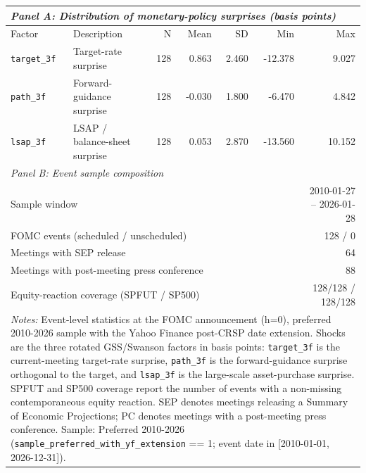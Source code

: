 \begin{tabular}{l l r r r r r}
\toprule
\multicolumn{7}{l}{\textit{Panel A: Distribution of monetary-policy surprises (basis points)}} \\
\midrule
Factor & Description & N & Mean & SD & Min & Max \\
\midrule
\texttt{target\_3f} & Target-rate surprise & 128 & 0.863 & 2.460 & -12.378 & 9.027 \\
\texttt{path\_3f} & Forward-guidance surprise & 128 & -0.030 & 1.800 & -6.470 & 4.842 \\
\texttt{lsap\_3f} & LSAP / balance-sheet surprise & 128 & 0.053 & 2.870 & -13.560 & 10.152 \\
\midrule
\multicolumn{7}{l}{\textit{Panel B: Event sample composition}} \\
\midrule
\multicolumn{6}{l}{Sample window} & 2010-01-27 -- 2026-01-28 \\
\multicolumn{6}{l}{FOMC events (scheduled / unscheduled)} & 128 / 0 \\
\multicolumn{6}{l}{Meetings with SEP release} & 64 \\
\multicolumn{6}{l}{Meetings with post-meeting press conference} & 88 \\
\multicolumn{6}{l}{Equity-reaction coverage (SPFUT / SP500)} & 128/128 / 128/128 \\
\bottomrule
\multicolumn{7}{p{\linewidth}}{\footnotesize \textit{Notes:} Event-level statistics at the FOMC announcement (h=0), preferred 2010-2026 sample with the Yahoo Finance post-CRSP date extension. Shocks are the three rotated GSS/Swanson factors \citep{gurkaynakSackSwanson2005,swanson2021} in basis points: \texttt{target\_3f} is the current-meeting target-rate surprise, \texttt{path\_3f} is the forward-guidance surprise orthogonal to the target, and \texttt{lsap\_3f} is the large-scale asset-purchase surprise. SPFUT and SP500 coverage report the number of events with a non-missing contemporaneous equity reaction. SEP denotes meetings releasing a Summary of Economic Projections; PC denotes meetings with a post-meeting press conference. Sample: Preferred 2010-2026 (\texttt{sample\_preferred\_with\_yf\_extension} == 1; event date in [2010-01-01, 2026-12-31]).} \\
\end{tabular}
